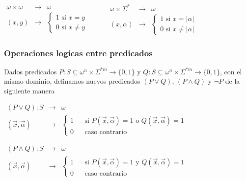 \(\displaystyle \begin{array}{rll} \omega \times \omega & \rightarrow & \omega \\ (x,y) & \rightarrow & \left\{ \begin{array}{l} 1\text{ si }x=y \\ 0\text{ si }x\neq y \end{array} \right. \end{array} \ \ \ \ \ \ \ \ \ \ \ \begin{array}{rll} \omega \times \Sigma ^{\ast } & \rightarrow & \omega \\ (x,\alpha ) & \rightarrow & \left\{ \begin{array}{l} 1\text{ si }x=\left\vert \alpha \right\vert \\ 0\text{ si }x\neq \left\vert \alpha \right\vert \end{array} \right. \end{array} \)

\subsubsection{Operaciones logicas entre predicados}

Dados predicados \(P:S\subseteq \omega ^{n}\times \Sigma ^{\ast m}\rightarrow \{0,1\}\) y \(Q:S\subseteq \omega ^{n}\times \Sigma ^{\ast m}\rightarrow \{0,1\}\), con el mismo dominio, definamos nuevos predicados \((P\vee Q)\), \( (P\wedge Q)\) y \(\lnot P\) de la siguiente manera

\(\displaystyle \begin{array}{rll} (P\vee Q):S & \rightarrow & \omega \\ (\vec{x},\vec{\alpha}) & \rightarrow & \left\{ \begin{array}{lll} 1 & & \text{si }P(\vec{x},\vec{\alpha})=1\text{ o }Q(\vec{x},\vec{\alpha})=1 \\ 0 & & \text{caso contrario} \end{array} \right. \end{array} \)

\(\displaystyle \begin{array}{rll} (P\wedge Q):S & \rightarrow & \omega \\ (\vec{x},\vec{\alpha}) & \rightarrow & \left\{ \begin{array}{lll} 1 & & \text{si }P(\vec{x},\vec{\alpha})=1\text{ y }Q(\vec{x},\vec{\alpha})=1 \\ 0 & & \text{caso contrario} \end{array} \right. \end{array} \)

